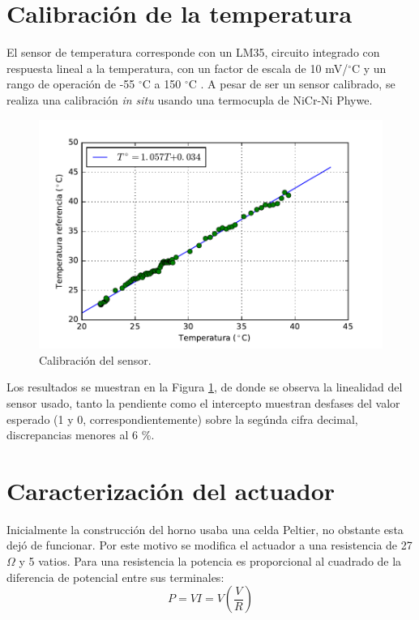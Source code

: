 \documentclass{wileysix}
\begin{document}
\section{Calibraci\'on de la temperatura}
El sensor de temperatura corresponde con un LM35, circuito integrado con respuesta lineal a la temperatura, con un factor de escala de 10 mV/$^\circ$C y un rango de operaci\'on de -55 $^\circ$C a 150 $^\circ$C \cite{LM35}. A pesar de ser un sensor calibrado, se realiza una calibraci\'on \textit{in situ} usando una termocupla de NiCr-Ni Phywe.
\begin{figure}[h]
	\centering
	\includegraphics[width=0.6\linewidth]{extras/temp_cal.pdf}
	\caption{Calibraci\'on del sensor.}
	\label{fig: temp calibration}
\end{figure}

Los resultados se muestran en la Figura \ref{fig: temp calibration}, de donde se observa la linealidad del sensor usado, tanto la pendiente como el intercepto muestran desfases del valor esperado (1 y 0, correspondientemente) sobre la seg\'unda cifra decimal, discrepancias menores al 6 \%.

\section{Caracterizaci\'on del actuador}
Inicialmente la construcci\'on del horno usaba una celda Peltier, no obstante esta dej\'o de funcionar. Por este motivo se modifica el actuador a una resistencia de 27 $\Omega$ y 5 vatios. Para una resistencia la potencia es proporcional al cuadrado de la diferencia de potencial entre sus terminales:
\begin{equation}
	P = VI = V\left(\frac{V}{R}\right)
\end{equation}
\end{document}
